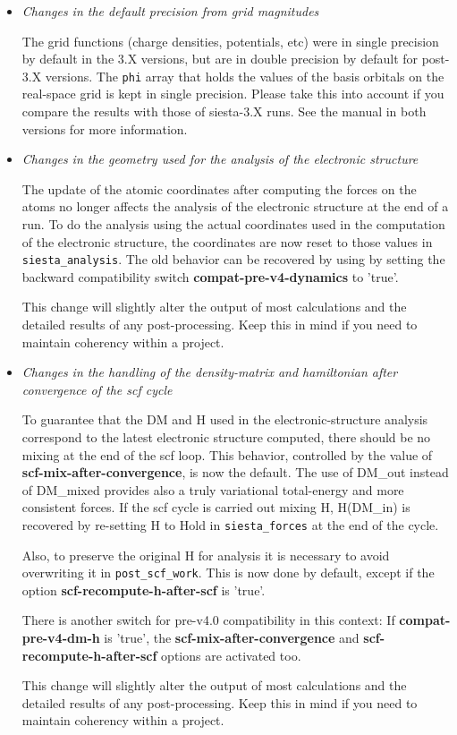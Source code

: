 \documentclass{article}
\newcommand{\opt}[1]{\textbf{#1}}
\newcommand{\code}[1]{\texttt{#1}}
\begin{document}
\begin{description}
\begin{itemize}
  \item\emph{Changes in the default precision from grid magnitudes}

    The grid functions (charge densities, potentials, etc) were in
    single precision by default in the 3.X versions, but are in double
    precision by default for post-3.X versions. The \code{phi}  array that
    holds the values of the basis orbitals on the real-space grid is kept in
    single precision. Please take this into account if you compare the
    results with those of siesta-3.X runs. See the manual in both
    versions for more information.

  \item\emph{Changes in the geometry used for the analysis of the
    electronic structure}

  The update of the atomic coordinates after computing the forces on
  the atoms no longer affects the analysis of the electronic
  structure at the end of a run. To do the analysis using the actual
  coordinates used in the computation of the electronic structure, the
  coordinates are now reset to those values in \code{siesta\_analysis}.  The old
  behavior can be recovered by using by setting the backward
  compatibility switch \opt{compat-pre-v4-dynamics} to 'true'.

  This change will slightly alter the output of most calculations and the
  detailed results of any post-processing. Keep this in mind if you
  need to maintain coherency within a project.


  \item\emph{Changes in the handling of the density-matrix and
    hamiltonian after convergence of the scf cycle}

    To guarantee that the DM and H used in the electronic-structure
    analysis correspond to the latest electronic structure computed,
    there should be no mixing at the end of the scf loop. This
    behavior, controlled by the value of \opt{scf-mix-after-convergence}, is
    now the default. The use of DM\_out instead of DM\_mixed provides
    also a truly variational total-energy and more consistent
    forces. If the scf cycle is carried out mixing H, H(DM\_in) is
    recovered by re-setting H to Hold in \code{siesta\_forces} at the end of
    the cycle.

    Also, to preserve the original H for analysis it is necessary to
    avoid overwriting it in \code{post\_scf\_work}. This is now done by
    default, except if the option \opt{scf-recompute-h-after-scf} is
    'true'.

    There is another switch for pre-v4.0 compatibility in this
    context: If \opt{compat-pre-v4-dm-h} is 'true', the
    \opt{scf-mix-after-convergence} and \opt{scf-recompute-h-after-scf}
    options are activated too.

    This change will slightly alter the output of most calculations
    and the detailed results of any post-processing. Keep this in mind
    if you need to maintain coherency within a project.
    
  \end{itemize}

\end{description}
\end{document}
